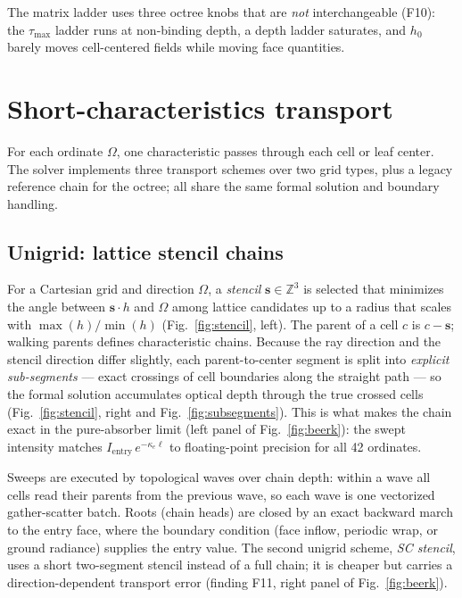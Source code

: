 \documentclass[11pt,a4paper]{article}
\newcommand{\ke}{\kappa_e}
\newcommand{\Om}{\Omega}
\begin{document}
The matrix ladder uses three octree knobs that are \emph{not}
interchangeable (F10): the $\tau_{\max}$ ladder runs at non-binding depth,
a depth ladder saturates, and $h_0$ barely moves cell-centered fields
while moving face quantities.

\section{Short-characteristics transport}
\label{sec:transport}

For each ordinate $\Om$, one characteristic passes through each cell or
leaf center. The solver implements three transport schemes over two grid
types, plus a legacy reference chain for the octree; all share the same
formal solution and boundary handling.

\subsection{Unigrid: lattice stencil chains}

For a Cartesian grid and direction $\Om$, a \emph{stencil}
$\mathbf s\in\mathbb Z^3$ is selected that minimizes the angle between
$\mathbf s\cdot h$ and $\Om$ among lattice candidates up to a radius
that scales with $\max(h)/\min(h)$ (Fig.~\ref{fig:stencil}, left). The
parent of a cell $c$ is $c-\mathbf s$; walking parents defines
characteristic chains. Because the ray direction and the stencil
direction differ slightly, each parent-to-center segment is split into
\emph{explicit sub-segments} --- exact crossings of cell boundaries along
the straight path --- so the formal solution accumulates optical depth
through the true crossed cells (Fig.~\ref{fig:stencil}, right and
Fig.~\ref{fig:subsegments}). This is what makes the chain exact in the
pure-absorber limit (left panel of Fig.~\ref{fig:beerk}): the swept
intensity matches $I_{\mathrm{entry}}\,e^{-\ke \ell}$ to floating-point
precision for all 42 ordinates.

Sweeps are executed by topological waves over chain depth: within a wave
all cells read their parents from the previous wave, so each wave is one
vectorized gather-scatter batch. Roots (chain heads) are closed by an
exact backward march to the entry face, where the boundary condition
(face inflow, periodic wrap, or ground radiance) supplies the entry
value. The second unigrid scheme, \emph{SC stencil}, uses a short
two-segment stencil instead of a full chain; it is cheaper but carries a
direction-dependent transport error (finding F11, right panel of
Fig.~\ref{fig:beerk}).
\end{document}
